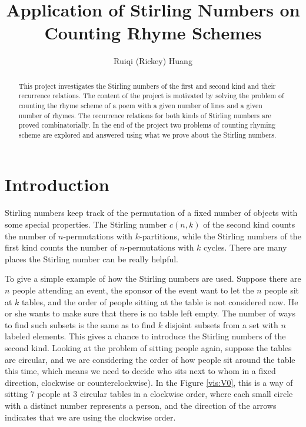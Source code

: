\documentclass{article}
\title{Application of Stirling Numbers on Counting Rhyme Schemes}
\author{Ruiqi (Rickey) Huang}
\theoremstyle{definition}
\theoremstyle{remark}
\theoremstyle{example}
\begin{document}
\maketitle

\begin{abstract}
    This project investigates the Stirling numbers of the first and second kind and their recurrence relations. The content of the project is motivated by solving the problem of counting the rhyme scheme of a poem with a given number of lines and a given number of rhymes. The recurrence relations for both kinds of Stirling numbers are proved combinatorially. In the end of the project two problems of counting rhyming scheme are explored and answered using what we prove about the Stirling numbers.
\end{abstract}

\section{Introduction}

\paragraph{   }

Stirling numbers keep track of the permutation of a fixed number of objects with some special properties. The Stirling number $c(n,k)$ of the second kind counts the number of $n$-permutations with $k$-partitions, while the Stirling numbers of the first kind counts the number of $n$-permutations with $k$ cycles. There are many places the Stirling number can be really helpful.

To give a simple example of how the Stirling numbers are used. Suppose there are $n$ people attending an event, the sponsor of the event want to let the $n$ people sit at $k$ tables, and the order of people sitting at the table is not considered now. He or she wants to make sure that there is no table left empty. The number of ways to find such subsets is the same as to find $k$ disjoint subsets from a set with $n$ labeled elements. This gives a chance to introduce the Stirling numbers of the second kind. Looking at the problem of sitting people again, suppose the tables are circular, and we are considering the order of how people sit around the table this time, which means we need to decide who sits next to whom in a fixed direction, clockwise or counterclockwise). In the Figure \ref{vis:V0}, this is a way of sitting $7$ people at $3$ circular tables in a clockwise order, where each small circle with a distinct number represents a person, and the direction of the arrows indicates that we are using the clockwise order.
\end{document}
